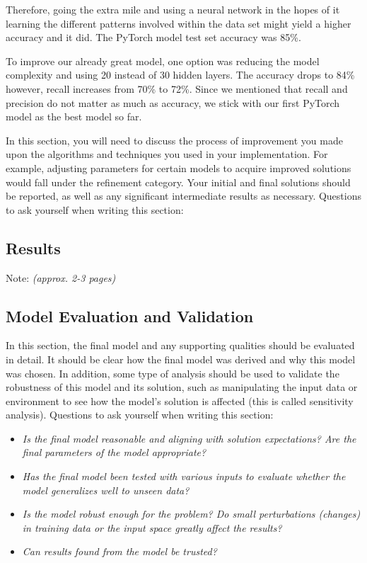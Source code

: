 \documentclass{article}
\begin{document}
Therefore, going the extra mile and using a neural network in the hopes of it
learning the different patterns involved within the data set might yield a higher
accuracy and it did. The PyTorch model test set accuracy was 85\%.

To improve our already great model, one option was reducing the model complexity
and using 20 instead of 30 hidden layers. The accuracy drops to 84\% however, 
recall increases from 70\% to 72\%. Since we mentioned that recall and precision
do not matter as much as accuracy, we stick with our first PyTorch model as the best
model so far.

In this section, you will need to discuss the process of improvement you
made upon the algorithms and techniques you used in your implementation.
For example, adjusting parameters for certain models to acquire improved
solutions would fall under the refinement category. Your initial and
final solutions should be reported, as well as any significant
intermediate results as necessary. Questions to ask yourself when
writing this section:

\subsection{Results}\label{kaggleresults}

Note: \emph{(approx. 2-3 pages)}

\subsection{Model Evaluation and
Validation}\label{model-evaluation-and-validation}

In this section, the final model and any supporting qualities should be
evaluated in detail. It should be clear how the final model was derived
and why this model was chosen. In addition, some type of analysis should
be used to validate the robustness of this model and its solution, such
as manipulating the input data or environment to see how the model's
solution is affected (this is called sensitivity analysis). Questions to
ask yourself when writing this section:

\begin{itemize}
\item
  \emph{Is the final model reasonable and aligning with solution
  expectations? Are the final parameters of the model appropriate?}
\item
  \emph{Has the final model been tested with various inputs to evaluate
  whether the model generalizes well to unseen data?}
\item
  \emph{Is the model robust enough for the problem? Do small
  perturbations (changes) in training data or the input space greatly
  affect the results?}
\item
  \emph{Can results found from the model be trusted?}
\end{itemize}
\end{document}
